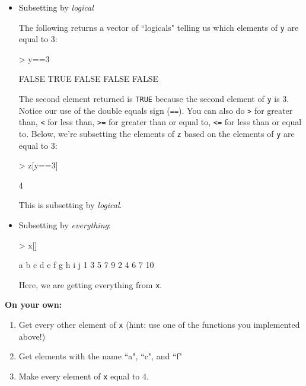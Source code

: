 \documentclass{exam}
\begin{document}
\begin{itemize}
\item Subsetting by \textit{logical}

The following returns a vector of ``logicals" telling us which elements of \texttt{y} are equal to 3:
\begin{Schunk}
\begin{Sinput}
> y==3  
\end{Sinput}
\begin{Soutput}
[1] FALSE  TRUE FALSE FALSE FALSE
\end{Soutput}
\end{Schunk}
The second element returned is \texttt{TRUE} because the second element of \texttt{y} is 3. Notice our use of the double equals sign (\texttt{==}). You can also do \texttt{>} for greater than, \texttt{<} for less than, \texttt{>=} for greater than or equal to, \texttt{<=} for less than or equal to.  Below, we're subsetting the elements of \texttt{z} based on the elements of \texttt{y} are equal to 3:
\begin{Schunk}
\begin{Sinput}
> z[y==3]  
\end{Sinput}
\begin{Soutput}
[1] 4
\end{Soutput}
\end{Schunk}
This is subsetting by \textit{logical}.

\item Subsetting by \textit{everything}:
\begin{Schunk}
\begin{Sinput}
> x[]  
\end{Sinput}
\begin{Soutput}
 a  b  c  d  e  f  g  h  i  j 
 1  3  5  7  9  2  4  6  7 10 
\end{Soutput}
\end{Schunk}
Here, we are getting everything from \texttt{x}.
\end{itemize}

\noindent\textbf{On your own:}

\begin{enumerate}
\item Get every other element of \texttt{x} (hint: use one of the functions you implemented above!)
\item Get elements with the name ``a", ``c", and ``f"
\item Make every element of \texttt{x} equal to 4.
\end{enumerate}

\begin{solution}
\end{solution}
\end{document}
